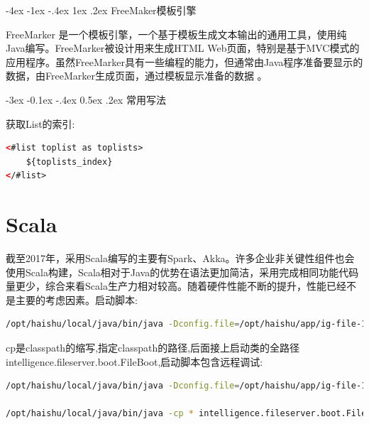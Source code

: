 \documentclass[12pt]{book}
\makeatletter
\numberwithin{dummy}{section}
\theoremstyle{ocrenumbox}
\theoremstyle{blacknumex}
\theoremstyle{blacknumbox}
\theoremstyle{ocrenum}
\renewcommand{\section}{\@startsection{section}{1}{\z@}
	{-4ex \@plus -1ex \@minus -.4ex}
	{1ex \@plus.2ex }
	{\normalfont\large\sffamily\bfseries}}
\renewcommand{\subsection}{\@startsection {subsection}{2}{\z@}
	{-3ex \@plus -0.1ex \@minus -.4ex}
	{0.5ex \@plus.2ex }
	{\normalfont\sffamily\bfseries}}
\makeatother
\begin{document}
\newpage

\section{FreeMaker模板引擎}

FreeMarker 是一个模板引擎，一个基于模板生成文本输出的通用工具，使用纯Java编写。FreeMarker被设计用来生成HTML Web页面，特别是基于MVC模式的应用程序。虽然FreeMarker具有一些编程的能力，但通常由Java程序准备要显示的数据，由FreeMarker生成页面，通过模板显示准备的数据 。

\subsection{常用写法}

获取List的索引:

\begin{lstlisting}[language=HTML]
<#list toplist as toplists>
	${toplists_index}
</#list>
\end{lstlisting}


\chapter{Scala}

截至2017年，采用Scala编写的主要有Spark、Akka。许多企业非关键性组件也会使用Scala构建，Scala相对于Java的优势在语法更加简洁，采用完成相同功能代码量更少，综合来看Scala生产力相对较高。随着硬件性能不断的提升，性能已经不是主要的考虑因素。启动脚本:


\begin{lstlisting}[language=Bash]
/opt/haishu/local/java/bin/java -Dconfig.file=/opt/haishu/app/ig-file-1.0.0/bin/../conf/application.conf -Dpidfile.path=/opt/haishu/app/ig-file-1.0.0/bin/../run/ig-file.pid -Dlogback.configurationFile=/opt/haishu/app/ig-file-1.0.0/bin/../conf/logback.xml -cp /opt/haishu/app/ig-file-1.0.0/lib/* intelligence.fileserver.boot.FileBoot -Xms2G -Xmx4G
\end{lstlisting}

cp是classpath的缩写,指定classpath的路径,后面接上启动类的全路径intelligence.fileserver.boot.FileBoot,启动脚本包含远程调试:

\begin{lstlisting}[language=Bash]
/opt/haishu/local/java/bin/java -Dconfig.file=/opt/haishu/app/ig-file-1.0.0/bin/../conf/application.conf -Dpidfile.path=/opt/haishu/app/ig-file-1.0.0/bin/../run/ig-file.pid -Dlogback.configurationFile=/opt/haishu/app/ig-file-1.0.0/bin/../conf/logback.xml -cp /opt/haishu/app/ig-file-1.0.0/lib/* intelligence.fileserver.boot.FileBoot -Xms2G -Xmx4G -Xdebug -Xrunjdwp:transport=dt_socket,suspend=n,server=y,address=5006

/opt/haishu/local/java/bin/java -cp * intelligence.fileserver.boot.FileBoot
\end{lstlisting}
\end{document}
